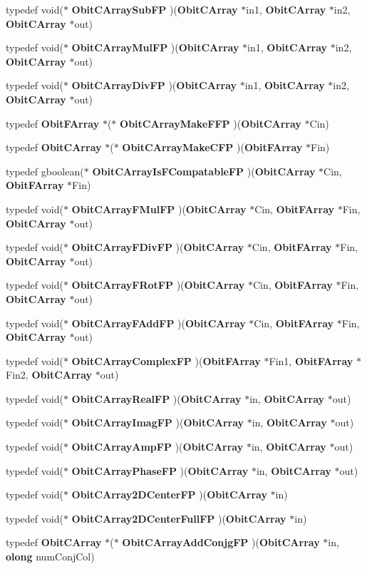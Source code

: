 \begin{CompactItemize}
\item 
typedef void($\ast$ {\bf Obit\-CArray\-Sub\-FP} )({\bf Obit\-CArray} $\ast$in1, {\bf Obit\-CArray} $\ast$in2, {\bf Obit\-CArray} $\ast$out)
\item 
typedef void($\ast$ {\bf Obit\-CArray\-Mul\-FP} )({\bf Obit\-CArray} $\ast$in1, {\bf Obit\-CArray} $\ast$in2, {\bf Obit\-CArray} $\ast$out)
\item 
typedef void($\ast$ {\bf Obit\-CArray\-Div\-FP} )({\bf Obit\-CArray} $\ast$in1, {\bf Obit\-CArray} $\ast$in2, {\bf Obit\-CArray} $\ast$out)
\item 
typedef {\bf Obit\-FArray} $\ast$($\ast$ {\bf Obit\-CArray\-Make\-FFP} )({\bf Obit\-CArray} $\ast$Cin)
\item 
typedef {\bf Obit\-CArray} $\ast$($\ast$ {\bf Obit\-CArray\-Make\-CFP} )({\bf Obit\-FArray} $\ast$Fin)
\item 
typedef gboolean($\ast$ {\bf Obit\-CArray\-Is\-FCompatable\-FP} )({\bf Obit\-CArray} $\ast$Cin, {\bf Obit\-FArray} $\ast$Fin)
\item 
typedef void($\ast$ {\bf Obit\-CArray\-FMul\-FP} )({\bf Obit\-CArray} $\ast$Cin, {\bf Obit\-FArray} $\ast$Fin, {\bf Obit\-CArray} $\ast$out)
\item 
typedef void($\ast$ {\bf Obit\-CArray\-FDiv\-FP} )({\bf Obit\-CArray} $\ast$Cin, {\bf Obit\-FArray} $\ast$Fin, {\bf Obit\-CArray} $\ast$out)
\item 
typedef void($\ast$ {\bf Obit\-CArray\-FRot\-FP} )({\bf Obit\-CArray} $\ast$Cin, {\bf Obit\-FArray} $\ast$Fin, {\bf Obit\-CArray} $\ast$out)
\item 
typedef void($\ast$ {\bf Obit\-CArray\-FAdd\-FP} )({\bf Obit\-CArray} $\ast$Cin, {\bf Obit\-FArray} $\ast$Fin, {\bf Obit\-CArray} $\ast$out)
\item 
typedef void($\ast$ {\bf Obit\-CArray\-Complex\-FP} )({\bf Obit\-FArray} $\ast$Fin1, {\bf Obit\-FArray} $\ast$Fin2, {\bf Obit\-CArray} $\ast$out)
\item 
typedef void($\ast$ {\bf Obit\-CArray\-Real\-FP} )({\bf Obit\-CArray} $\ast$in, {\bf Obit\-CArray} $\ast$out)
\item 
typedef void($\ast$ {\bf Obit\-CArray\-Imag\-FP} )({\bf Obit\-CArray} $\ast$in, {\bf Obit\-CArray} $\ast$out)
\item 
typedef void($\ast$ {\bf Obit\-CArray\-Amp\-FP} )({\bf Obit\-CArray} $\ast$in, {\bf Obit\-CArray} $\ast$out)
\item 
typedef void($\ast$ {\bf Obit\-CArray\-Phase\-FP} )({\bf Obit\-CArray} $\ast$in, {\bf Obit\-CArray} $\ast$out)
\item 
typedef void($\ast$ {\bf Obit\-CArray2DCenter\-FP} )({\bf Obit\-CArray} $\ast$in)
\item 
typedef void($\ast$ {\bf Obit\-CArray2DCenter\-Full\-FP} )({\bf Obit\-CArray} $\ast$in)
\item 
typedef {\bf Obit\-CArray} $\ast$($\ast$ {\bf Obit\-CArray\-Add\-Conjg\-FP} )({\bf Obit\-CArray} $\ast$in, {\bf olong} num\-Conj\-Col)
\end{CompactItemize}

